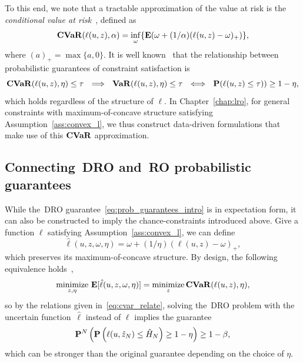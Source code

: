 To this end, we note that a tractable approximation of the value at risk is the {\it conditional value at risk}~\citep{cvaropt,cvar}, defined as
\begin{equation}
\mathop{\bf CVaR}(\ell(u,z),\alpha) = \inf_{\omega}\{\mathbf{E}(\omega + (1/\alpha)(\ell(u,z)- \omega)_+)\},
\end{equation}
where $(a)_+ = \max\{a,0\}$. 
It is well known~\cite{cvaropt} that the relationship between probabilistic guarantees of constraint satisfaction is
\begin{equation}
  \label{eq:cvar_relate}
\mathop{\bf CVaR}(\ell(u,z),\eta) \leq \tau ~~ \Longrightarrow~~ \mathop{\bf VaR}(\ell(u,z),\eta)\leq \tau ~~\Longleftrightarrow ~~{\mathbf P}(\ell(u,z)\leq \tau)) \geq 1 - \eta,
\end{equation}
which holds regardless of the structure of $\ell$. 
In Chapter~\ref{chap:lro}, for general constraints with maximum-of-concave structure satisfying Assumption~\ref{ass:convex_l}, we thus construct data-driven formulations that make use of this $\mathop{\bf CVaR}$ approximation.


\subsection{Connecting~\gls{DRO} and~\gls{RO} probabilistic guarantees}
\label{sec:connect_dro_ro}
While the~\gls{DRO} guarantee~\eqref{eq:prob_guarantees_intro} is in expectation form, it can also be constructed to imply the chance-constraints introduced above. 
Give a function $\ell$ satisfying Assumption~\ref{ass:convex_l}, we can define
$$\hat{\ell}(u,z,\omega,\eta) = \omega + (1/\eta)(\ell(u,z)- \omega)_+,$$
which preserves its maximum-of-concave structure. By design, the following equivalence holds~\citep{cvaropt},
$$\underset{z,\eta}{\text{minimize}}~\mathbf{E}[\hat{\ell}(u,z,\omega,\eta)] = \underset{z}{\text{minimize}} \mathop{\bf CVaR} (\ell(u,z),\eta),$$
so by the relations given in~\eqref{eq:cvar_relate}, solving the~\gls{DRO} problem with the uncertain function~$\hat{\ell}$ instead of $\ell$ implies the guarantee
\begin{equation}
	\label{eq:prob_guarantees_intro}
	{\mathbf P}^N\left( {\mathbf P}\left(\ell(u, \hat{z}_N) \leq \hat{H}_N\right) \geq 1 - \eta  \right) \ge 1 - \beta,
\end{equation}
which can be stronger than the original guarantee depending on the choice of $\eta$.

